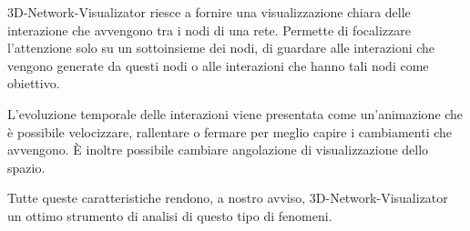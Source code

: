 \documentclass[a4paper,12pt]{article}
\begin{document}
3D-Network-Visualizator riesce a fornire una visualizzazione chiara delle interazione che avvengono tra i nodi di una rete. Permette di focalizzare l'attenzione solo su un sottoinsieme dei nodi, di guardare alle interazioni che vengono generate da questi nodi o alle interazioni che hanno tali nodi come obiettivo.

L'evoluzione temporale delle interazioni viene presentata come un'animazione che \`e possibile velocizzare, rallentare o fermare per meglio capire i cambiamenti che avvengono. \`E inoltre possibile cambiare angolazione di visualizzazione dello spazio.

Tutte queste caratteristiche rendono, a nostro avviso, 3D-Network-Visualizator un ottimo strumento di analisi di questo tipo di fenomeni.

\end{document}
